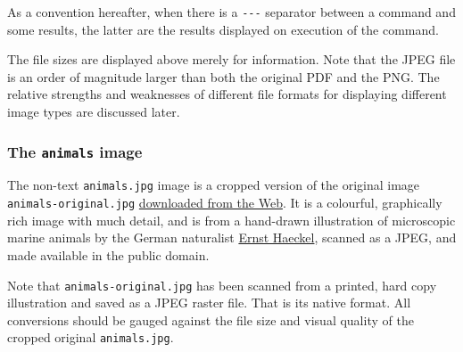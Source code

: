 \documentclass[
  11pt,
  british,
  a4paper,
]{article}
\begin{document}
As a convention hereafter, when there is a \texttt{-\/-\/-} separator
between a command and some results, the latter are the results displayed
on execution of the command.

The file sizes are displayed above merely for information. Note that the
JPEG file is an order of magnitude larger than both the original PDF and
the PNG. The relative strengths and weaknesses of different file formats
for displaying different image types are discussed later.

\hypertarget{the-animals-image}{%
\subsubsection{\texorpdfstring{The \texttt{animals}
image}{The animals image}}\label{the-animals-image}}

The non-text \texttt{animals.jpg} image is a cropped version of the
original image \texttt{animals-original.jpg}
\href{https://www.rawpixel.com/image/2266608/free-illustration-image-ernst-haeckel-vintage-animals}{downloaded
from the Web}. It is a colourful, graphically rich image with much
detail, and is from a hand-drawn illustration of microscopic marine
animals by the German naturalist
\href{https://en.wikipedia.org/wiki/Ernst_Haeckel}{Ernst Haeckel},
scanned as a JPEG, and made available in the public domain.

Note that \texttt{animals-original.jpg} has been scanned from a printed,
hard copy illustration and saved as a JPEG raster file. That is its
native format. All conversions should be gauged against the file size
and visual quality of the cropped original \texttt{animals.jpg}.
\end{document}
